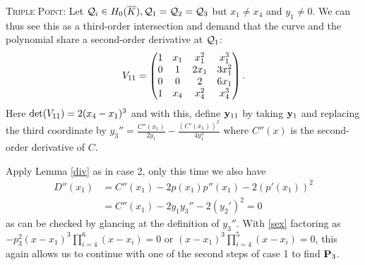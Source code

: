 \documentclass[english,11pt,a4paper]{article}
\begin{document}
\begin{case}
	{\scshape Triple Point:} Let $\q_i \in \enkb , \q_1=\q_2=\q_3$ but $x_1 \neq x_4$ and $y_1 \neq 0$. We can thus see this as a third-order intersection and demand that the curve and the polynomial share a second-order derivative at $\q_1$:
	\begin{align*}\Vtri=
			\begin{pmatrix}
			1 & x_1 & x_1^2 & x_1^3\\
			0 & 1 & 2 x_1 & 3 x_1^2\\
			0 & 0 & 2 & 6x_1\\
			1 & x_4 & x_4^2 & x_4^3\\
		\end{pmatrix}.
	\end{align*}
	Here $\det(\Vtri)=2(x_4-x_1)^3$ and with this, define $\ytri$ by taking $\ydoub$ and replacing the third coordinate by $y_3'' = \frac{C''(x_1)}{2y_1}-\frac{(C'(x_1))^2}{4y_1^3}$ where $C''(x)$ is the second-order derivative of $C$.

	Apply Lemma \ref{div} as in case 2, only this time we also have
	\begin{align*}
	  D''(x_1) &= C''(x_1) - 2 p(x_1)p''(x_1) - 2 (p'(x_1))^2\\
	  				 &= C''(x_1) - 2 y_1 y_3''- 2(y_2')^2 = 0
	\end{align*}
	as can be checked by glancing at the definition of $y_3''$. With \eqref{sex} factoring as $-p_3^2(x-x_1)^3\prod_{i=4}^6(x-x_i)=0$ or $(x-x_1)^3\prod_{i=4}^5(x-x_i)=0$, this again allows us to continue with one of the second steps of case 1 to find $\P_3$.
\end{case}
\end{document}
